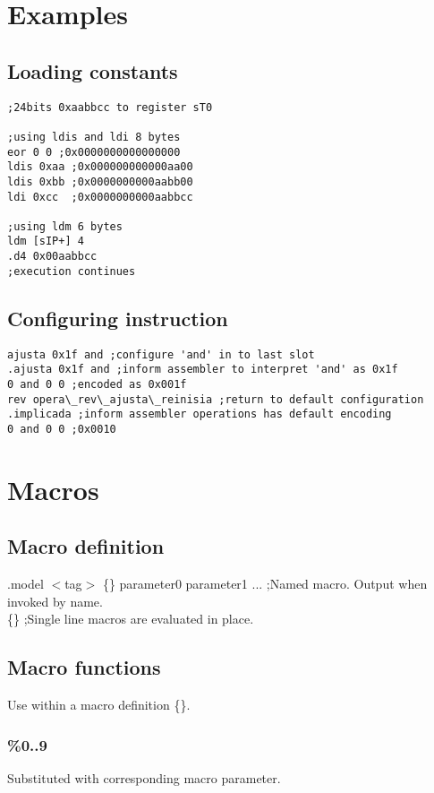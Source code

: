 \documentclass[a4paper,11pt]{article}
\begin{document}
\pagebreak
\section{Examples}

\subsection{Loading constants}

\begin{verbatim}
;24bits 0xaabbcc to register sT0

;using ldis and ldi 8 bytes
eor 0 0 ;0x0000000000000000
ldis 0xaa ;0x000000000000aa00
ldis 0xbb ;0x0000000000aabb00
ldi 0xcc  ;0x0000000000aabbcc

;using ldm 6 bytes
ldm [sIP+] 4
.d4 0x00aabbcc
;execution continues
\end{verbatim}

\subsection{Configuring instruction}

\begin{verbatim}
ajusta 0x1f and ;configure 'and' in to last slot
.ajusta 0x1f and ;inform assembler to interpret 'and' as 0x1f
0 and 0 0 ;encoded as 0x001f
rev opera\_rev\_ajusta\_reinisia ;return to default configuration
.implicada ;inform assembler operations has default encoding
0 and 0 0 ;0x0010
\end{verbatim}

\pagebreak
\section{Macros}

\subsection{Macro definition}
.model $<$tag$>$ \{\} parameter0 parameter1 ... ;Named macro. Output when invoked by name.\\
\{\} ;Single line macros are evaluated in place.

\subsection{Macro functions}
Use within a macro definition \{\}.

\subsubsection{\%0..9} 
 Substituted with corresponding macro parameter.
\end{document}
